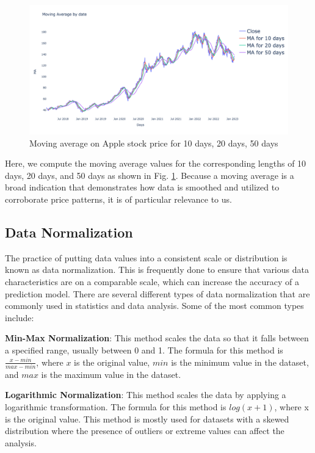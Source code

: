 \documentclass[a4paper]{article}
\begin{document}
\begin{figure}[!h]
    \centering
    \includegraphics[width=15cm]{ma.png}
    \caption{Moving average on Apple stock price for 10 days, 20 days, 50 days}
    \label{fig:ma}
\end{figure}

Here, we compute the moving average values for the corresponding lengths of 10 days, 20 days, and 50 days as shown in Fig. \ref{fig:ma}. Because a moving average is a broad indication that demonstrates how data is smoothed and utilized to corroborate price patterns, it is of particular relevance to us.
\subsection{Data Normalization}
The practice of putting data values into a consistent scale or distribution is known as data normalization. This is frequently done to ensure that various data characteristics are on a comparable scale, which can increase the accuracy of a prediction model. There are several different types of data normalization that are commonly used in statistics and data analysis. Some of the most common types include:

\textbf{Min-Max Normalization}: This method scales the data so that it falls between a specified range, usually between 0 and 1. The formula for this method is $\frac{x-min}{max-min}$, where $x$ is the original value, $min$ is the minimum value in the dataset, and $max$ is the maximum value in the dataset.


\textbf{Logarithmic Normalization}: This method scales the data by applying a logarithmic transformation. The formula for this method is $log(x+1)$, where x is the original value. This method is mostly used for datasets with a skewed distribution where the presence of outliers or extreme values can affect the analysis.
\end{document}
